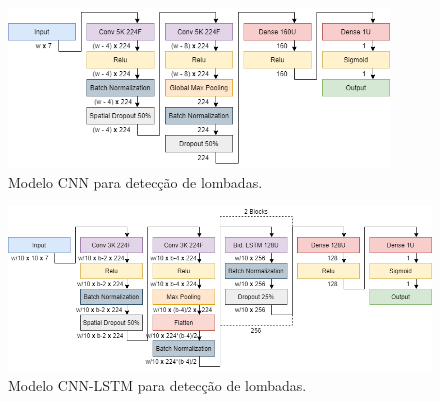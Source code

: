 \begin{figure}[h!]
  \centering
  \caption{Modelo CNN para detecção de lombadas.}
  \label{fig:best_cnn_tipo_lombadas}
  \includegraphics[width=0.9\textwidth]{figuras/fig_42.png}
\end{figure}

\begin{figure}[h!]
  \centering
  \caption{Modelo CNN-LSTM para detecção de lombadas.}
  \label{fig:best_cnn_lstm_tipo_lombadas}
  \includegraphics[width=1\textwidth]{figuras/fig_43.png}
\end{figure}

